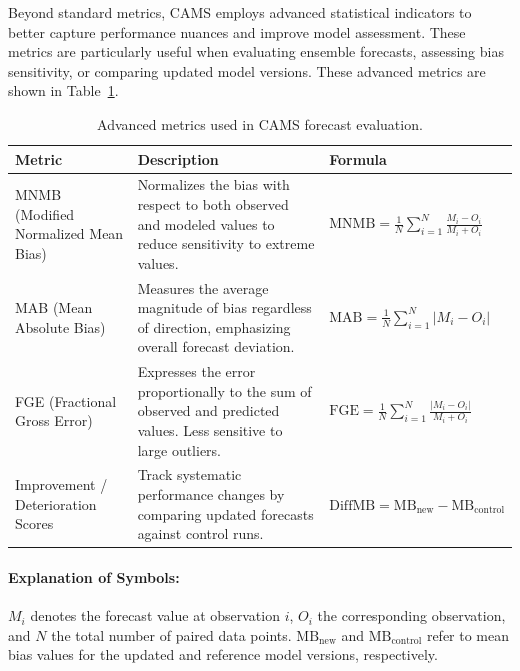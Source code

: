 Beyond standard metrics, CAMS employs advanced statistical indicators to better capture performance nuances and improve model assessment. These metrics are particularly useful when evaluating ensemble forecasts, assessing bias sensitivity, or comparing updated model versions. These advanced metrics are shown in Table~\ref{tab:advanced_metrics}.

\begin{table}[h!]
	\renewcommand{\arraystretch}{1.5}
	\centering
	\begin{tabular}{p{3cm} p{5cm} p{6cm}}
		\hline
		\textbf{Metric} & \textbf{Description} & \textbf{Formula} \\
		\hline
		MNMB (Modified Normalized Mean Bias) & Normalizes the bias with respect to both observed and modeled values to reduce sensitivity to extreme values. & 
		$\mathrm{MNMB} = \frac{1}{N} \sum_{i=1}^{N} \frac{M_i - O_i}{M_i + O_i}$ \\
		
		MAB (Mean Absolute Bias) & Measures the average magnitude of bias regardless of direction, emphasizing overall forecast deviation. & 
		$\mathrm{MAB} = \frac{1}{N} \sum_{i=1}^{N} | M_i - O_i |$ \\
		
		FGE (Fractional Gross Error) & Expresses the error proportionally to the sum of observed and predicted values. Less sensitive to large outliers. &
		$\mathrm{FGE} = \frac{1}{N} \sum_{i=1}^{N} \frac{|M_i - O_i|}{M_i + O_i}$ \\
		
		Improvement / Deterioration Scores & Track systematic performance changes by comparing updated forecasts against control runs. & 
		$\mathrm{DiffMB} = \mathrm{MB}_{\mathrm{new}} - \mathrm{MB}_{\mathrm{control}}$ \\
		\hline
	\end{tabular}
	\caption{Advanced metrics used in CAMS forecast evaluation.}
	\label{tab:advanced_metrics}
\end{table}

\paragraph{Explanation of Symbols:}
$M_i$ denotes the forecast value at observation $i$, $O_i$ the corresponding observation, and $N$ the total number of paired data points. 
$\mathrm{MB}_{\mathrm{new}}$ and $\mathrm{MB}_{\mathrm{control}}$ refer to mean bias values for the updated and reference model versions, respectively.

